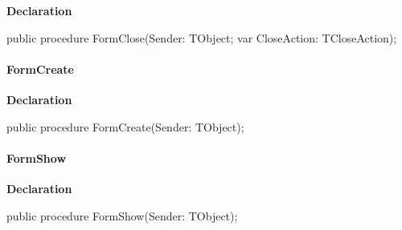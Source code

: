 \documentclass{report}
\newif\ifpdf
\begin{document}
\label{uninstall.TRMForm-FormClose}
\begin{list}{}{
\setlength{\itemindent}{0cm}
\setlength{\listparindent}{0cm}
\setlength{\leftmargin}{\evensidemargin}
\addtolength{\leftmargin}{\tmplength}
\settowidth{\labelsep}{X}
\addtolength{\leftmargin}{\labelsep}
\setlength{\labelwidth}{\tmplength}
}
\item[\textbf{Declaration}\hfill]
\ifpdf
\begin{flushleft}
\fi
\begin{ttfamily}
public procedure FormClose(Sender: TObject; var CloseAction: TCloseAction);\end{ttfamily}

\ifpdf
\end{flushleft}
\fi

\end{list}
\paragraph*{FormCreate}\hspace*{\fill}

\label{uninstall.TRMForm-FormCreate}
\begin{list}{}{
\setlength{\itemindent}{0cm}
\setlength{\listparindent}{0cm}
\setlength{\leftmargin}{\evensidemargin}
\addtolength{\leftmargin}{\tmplength}
\settowidth{\labelsep}{X}
\addtolength{\leftmargin}{\labelsep}
\setlength{\labelwidth}{\tmplength}
}
\item[\textbf{Declaration}\hfill]
\ifpdf
\begin{flushleft}
\fi
\begin{ttfamily}
public procedure FormCreate(Sender: TObject);\end{ttfamily}

\ifpdf
\end{flushleft}
\fi

\end{list}
\paragraph*{FormShow}\hspace*{\fill}

\label{uninstall.TRMForm-FormShow}
\begin{list}{}{
\setlength{\itemindent}{0cm}
\setlength{\listparindent}{0cm}
\setlength{\leftmargin}{\evensidemargin}
\addtolength{\leftmargin}{\tmplength}
\settowidth{\labelsep}{X}
\addtolength{\leftmargin}{\labelsep}
\setlength{\labelwidth}{\tmplength}
}
\item[\textbf{Declaration}\hfill]
\ifpdf
\begin{flushleft}
\fi
\begin{ttfamily}
public procedure FormShow(Sender: TObject);\end{ttfamily}

\ifpdf
\end{flushleft}
\fi

\end{list}
\end{document}
